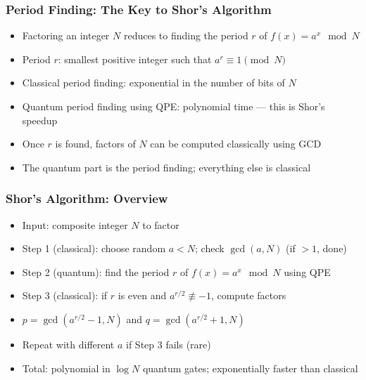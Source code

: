 \begin{frame}[fragile]\frametitle{Period Finding: The Key to Shor's Algorithm}
\begin{itemize}
\item Factoring an integer $N$ reduces to finding the period $r$ of $f(x) = a^x \mod N$
\item Period $r$: smallest positive integer such that $a^r \equiv 1 \pmod{N}$
\item Classical period finding: exponential in the number of bits of $N$
\item Quantum period finding using QPE: polynomial time --- this is Shor's speedup
\item Once $r$ is found, factors of $N$ can be computed classically using GCD
\item The quantum part is the period finding; everything else is classical
\end{itemize}
\end{frame}

\begin{frame}[fragile]\frametitle{Shor's Algorithm: Overview}
\begin{itemize}
\item Input: composite integer $N$ to factor
\item Step 1 (classical): choose random $a < N$; check $\gcd(a,N)$ (if $> 1$, done)
\item Step 2 (quantum): find the period $r$ of $f(x) = a^x \mod N$ using QPE
\item Step 3 (classical): if $r$ is even and $a^{r/2} \not\equiv -1$, compute factors
\item $p = \gcd(a^{r/2} - 1, N)$ and $q = \gcd(a^{r/2} + 1, N)$
\item Repeat with different $a$ if Step 3 fails (rare)
\item Total: polynomial in $\log N$ quantum gates; exponentially faster than classical
\end{itemize}
\end{frame}

